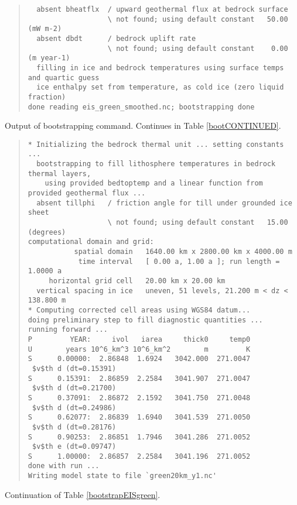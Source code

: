 \begin{table}
\begin{quote}
\begin{verbatim}
  absent bheatflx  / upward geothermal flux at bedrock surface
                   \ not found; using default constant   50.00 (mW m-2)
  absent dbdt      / bedrock uplift rate
                   \ not found; using default constant    0.00 (m year-1)
  filling in ice and bedrock temperatures using surface temps and quartic guess
  ice enthalpy set from temperature, as cold ice (zero liquid fraction)
done reading eis_green_smoothed.nc; bootstrapping done
\end{verbatim}
\end{quote}
\normalsize
\bigskip
\caption{Output of bootstrapping command.  Continues in Table \ref{bootCONTINUED}.}
\label{bootstrapEISgreen}
\end{table}

\begin{table}
\centering
\scriptsize
\begin{quote}
\begin{verbatim}
* Initializing the bedrock thermal unit ... setting constants ...
  bootstrapping to fill lithosphere temperatures in bedrock thermal layers,
    using provided bedtoptemp and a linear function from provided geothermal flux ...
  absent tillphi   / friction angle for till under grounded ice sheet
                   \ not found; using default constant   15.00 (degrees)
computational domain and grid:
           spatial domain   1640.00 km x 2800.00 km x 4000.00 m
            time interval   [ 0.00 a, 1.00 a ]; run length = 1.0000 a
     horizontal grid cell   20.00 km x 20.00 km
  vertical spacing in ice   uneven, 51 levels, 21.200 m < dz < 138.800 m
* Computing corrected cell areas using WGS84 datum...
doing preliminary step to fill diagnostic quantities ...
running forward ...
P         YEAR:     ivol   iarea     thick0     temp0
U        years 10^6_km^3 10^6_km^2        m         K
S      0.00000:  2.86848  1.6924   3042.000  271.0047
 $v$th d (dt=0.15391)
S      0.15391:  2.86859  2.2584   3041.907  271.0047
 $v$th d (dt=0.21700)
S      0.37091:  2.86872  2.1592   3041.750  271.0048
 $v$th d (dt=0.24986)
S      0.62077:  2.86839  1.6940   3041.539  271.0050
 $v$th d (dt=0.28176)
S      0.90253:  2.86851  1.7946   3041.286  271.0052
 $v$th e (dt=0.09747)
S      1.00000:  2.86857  2.2584   3041.196  271.0052
done with run ... 
Writing model state to file `green20km_y1.nc'
\end{verbatim}
\end{quote}
\normalsize
\bigskip

\caption{Continuation of Table \ref{bootstrapEISgreen}.}
\label{bootCONTINUED}
\end{table}

